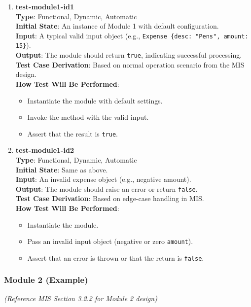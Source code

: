 \documentclass[12pt, titlepage]{article}
\begin{document}
\begin{enumerate}
    \item \textbf{test-module1-id1} \\
        \textbf{Type}: Functional, Dynamic, Automatic \\
        \textbf{Initial State}: An instance of Module 1 with default configuration. \\
        \textbf{Input}: A typical valid input object (e.g., \texttt{Expense \{desc: "Pens", amount: 15\}}). \\
        \textbf{Output}: The module should return \texttt{true}, indicating successful processing. \\
        \textbf{Test Case Derivation}: Based on normal operation scenario from the MIS design. \\
        \textbf{How Test Will Be Performed}: 
        \begin{itemize}
            \item Instantiate the module with default settings.
            \item Invoke the method with the valid input.
            \item Assert that the result is \texttt{true}.
        \end{itemize}
    \item \textbf{test-module1-id2} \\
        \textbf{Type}: Functional, Dynamic, Automatic \\
        \textbf{Initial State}: Same as above. \\
        \textbf{Input}: An invalid expense object (e.g., negative amount). \\
        \textbf{Output}: The module should raise an error or return \texttt{false}. \\
        \textbf{Test Case Derivation}: Based on edge-case handling in MIS. \\
        \textbf{How Test Will Be Performed}:
        \begin{itemize}
            \item Instantiate the module.
            \item Pass an invalid input object (negative or zero \texttt{amount}).
            \item Assert that an error is thrown or that the return is \texttt{false}.
        \end{itemize}
\end{enumerate}

\subsubsection{Module 2 (Example)}
\textit{(Reference MIS Section 3.2.2 for Module 2 design)}
\end{document}
